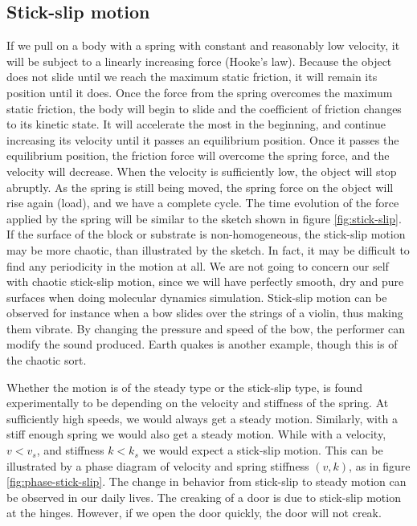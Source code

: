 \documentclass[twoside,english]{uiofysmaster}
\begin{document}
\subsection{Stick-slip motion}
If we pull on a body with a spring with constant and reasonably low velocity, it will be subject to a linearly increasing force (Hooke's law). 
Because the object does not slide until we reach the maximum static friction, it will remain its position until it does.
Once the force from the spring overcomes the maximum static friction, the body will begin to slide and the coefficient of friction changes to its kinetic state.
It will accelerate the most in the beginning, and continue increasing its velocity until it passes an equilibrium position.
Once it passes the equilibrium position, the friction force will overcome the spring force, and the velocity will decrease. 
When the velocity is sufficiently low, the object will stop abruptly. 
As the spring is still being moved, the spring force on the object will rise again (load), and we have a complete cycle.
The time evolution of the force applied by the spring will be similar to the sketch shown in figure \ref{fig:stick-slip}.
If the surface of the block or substrate is non-homogeneous, the stick-slip motion may be more chaotic, than illustrated by the sketch. 
In fact, it may be difficult to find any periodicity in the motion at all. 
We are not going to concern our self with chaotic stick-slip motion, since we will have perfectly smooth, dry and pure surfaces when doing molecular dynamics simulation.  
Stick-slip motion can be observed for instance when a bow slides over the strings of a violin, thus making them vibrate. 
By changing the pressure and speed of the bow, the performer can modify the sound produced. 
Earth quakes is another example, though this is of the chaotic sort.

Whether the motion is of the steady type or the stick-slip type, is found experimentally to be depending on the velocity and  stiffness of the spring.
At sufficiently high speeds, we would always get a steady motion. 
Similarly, with a stiff enough spring we would also get a steady motion. 
While with a velocity, $v<v_s$, and stiffness $k<k_s$ we would expect a stick-slip motion.
This can be illustrated by a phase diagram of velocity and spring stiffness $(v,k)$, as in figure \ref{fig:phase-stick-slip}.
The change in behavior from stick-slip to steady motion can be observed in our daily lives. 
The creaking of a door is due to stick-slip motion at the hinges.
However, if we open the door quickly, the door will not creak.
\end{document}
